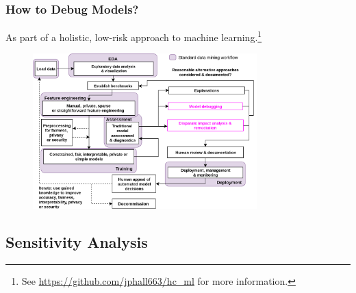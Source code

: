\documentclass[11pt,
               aspectratio=43,
               hyperref={colorlinks}
               ]{beamer}
\begin{document}
			\begin{frame}
		
				\frametitle{How to Debug Models?}
		
				\footnotesize{As part of a holistic, low-risk approach to machine learning}.\footnote{See \url{https://github.com/jphall663/hc_ml} for more information.}
				\begin{figure}[htb]
					\begin{center}
						\includegraphics[height=170pt]{img/blueprint.png}
					\end{center}
				\end{figure}	
				\normalsize
		
			\end{frame}

		\subsection{Sensitivity Analysis}
\end{document}
